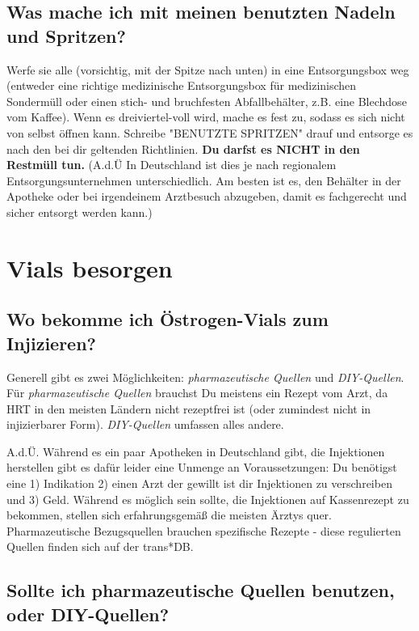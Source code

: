 \documentclass{article}
\begin{document}
{\subsection{Was mache ich mit meinen benutzten Nadeln und Spritzen?}\label{5-27}

Werfe sie alle (vorsichtig, mit der Spitze nach unten) in eine Entsorgungsbox weg (entweder eine richtige medizinische Entsorgungsbox für medizinischen Sondermüll oder einen stich- und bruchfesten Abfallbehälter, z.B. eine Blechdose vom Kaffee). Wenn es dreiviertel-voll wird, mache es fest zu, sodass es sich nicht von selbst öffnen kann. Schreibe "BENUTZTE SPRITZEN" drauf und entsorge es nach den bei dir geltenden Richtlinien. \textbf{Du darfst es NICHT in den Restmüll tun.} (A.d.Ü In Deutschland ist dies je nach regionalem Entsorgungsunternehmen unterschiedlich. Am besten ist es, den Behälter in der Apotheke oder bei irgendeinem Arztbesuch abzugeben, damit es fachgerecht und sicher entsorgt werden kann.)



\section{Vials besorgen}\label{sv}

\subsection{Wo bekomme ich Östrogen-Vials zum Injizieren?}

Generell gibt es zwei Möglichkeiten: \textit{pharmazeutische Quellen} und \textit{DIY-Quellen}. Für \textit{pharmazeutische Quellen} brauchst Du meistens ein Rezept vom Arzt, da HRT in den meisten Ländern nicht rezeptfrei ist (oder zumindest nicht in injizierbarer Form). \textit{DIY-Quellen} umfassen alles andere. 

A.d.Ü. Während es ein paar Apotheken in Deutschland gibt, die Injektionen herstellen gibt es dafür leider eine Unmenge an Voraussetzungen: Du benötigst eine 1) Indikation 2) einen Arzt der gewillt ist dir Injektionen zu verschreiben und 3) Geld. Während es möglich sein sollte, die Injektionen auf Kassenrezept zu bekommen, stellen sich erfahrungsgemäß die meisten Ärztys quer. Pharmazeutische Bezugsquellen brauchen spezifische Rezepte - diese regulierten Quellen finden sich auf der trans*DB.

\subsection{Sollte ich pharmazeutische Quellen benutzen, oder DIY-Quellen?}

}
\end{document}
